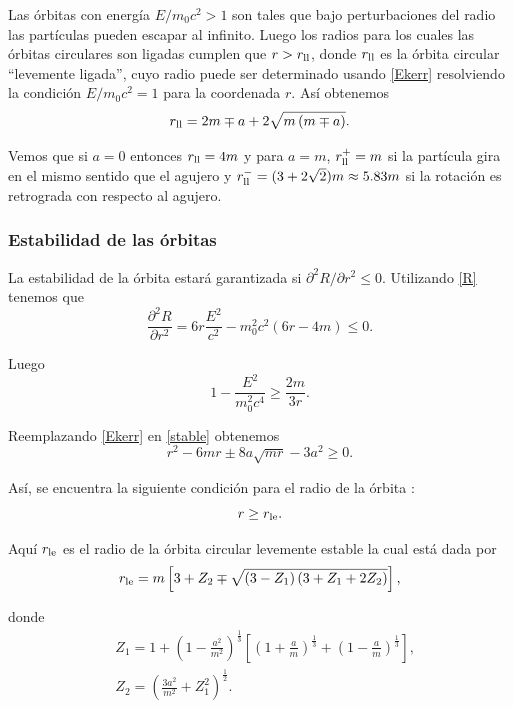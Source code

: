 Las órbitas con energía $E/m_0c^2>1$ son tales que bajo perturbaciones del radio las partículas pueden escapar al infinito. Luego los radios para los cuales las órbitas circulares son ligadas cumplen que $r>r_{\rm ll}$, donde $r_{\rm ll}$ es la órbita circular ``levemente ligada'', cuyo radio puede ser determinado usando \eqref{Ekerr} resolviendo la condición $E/m_0c^2=1$ para la coordenada $r$. Así obtenemos
\begin{equation}\label{mborbit}
r_{\rm ll}=2m\mp a+2\sqrt{m\left(m\mp a \right)}.
\end{equation}

Vemos que si $a=0$ entonces $r_{\rm ll}=4m$ y para $a=m$, $r_{\rm ll}^+=m$ si la partícula gira en el mismo sentido que el agujero y $r_{\rm ll}^-=(3+2\sqrt{2})m\approx 5.83m$ si la rotación es retrograda con respecto al agujero.

\subsubsection{Estabilidad de las órbitas}
La estabilidad de la órbita estará garantizada si $\partial^2 R/\partial r^2 \leq 0$. Utilizando \eqref{R} tenemos que
\begin{equation}
\frac{\partial^2 R}{\partial r^2}=6r\frac{E^2}{c^2}-m_0^2c^2\left(6r-4m\right) \leq 0.
\end{equation}

Luego
\begin{equation}\label{stable}
1-\frac{E^2}{m_0^2c^4} \geq \frac{2m}{3r}.
\end{equation}

Reemplazando \eqref{Ekerr} en \eqref{stable} obtenemos
\begin{equation}
r^2-6mr\pm 8a\sqrt{mr}-3a^2 \geq 0.
\end{equation}

Así, se encuentra la siguiente condición para el radio de la órbita :
\begin{equation}
r \geq r_{\rm le}.
\end{equation}

Aquí $r_{\rm le}$ es el radio de la órbita circular levemente estable la cual está dada por
\begin{equation}
r_{\rm le}=m\left[ 3+Z_2\mp \sqrt{\left(3-Z_1\right)\left( 3+Z_1+2Z_2\right)}\right],
\end{equation}

donde
\begin{eqnarray}
&Z_1=1+\left( 1-\frac{a^2}{m^2}\right)^{\frac{1}{3}}\left[\left( 1+\frac{a}{m}\right)^{\frac{1}{3}}+\left( 1-\frac{a}{m}\right)^{\frac{1}{3}} \right] ,\\
&Z_2 =\left(\frac{3a^2}{m^2}+Z_1^2 \right)^{\frac{1}{2}}.
\end{eqnarray}

